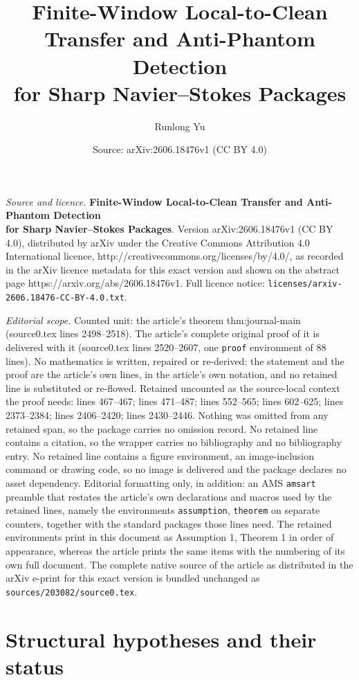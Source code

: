 \documentclass[10pt,a4paper]{amsart}
\title{\textbf{Finite-Window Local-to-Clean Transfer and Anti-Phantom Detection\\ for Sharp Navier--Stokes Packages}}
\author{Runlong Yu}
\date{Source: arXiv:2606.18476v1 (CC BY 4.0)}
\begin{document}
\maketitle

\noindent\emph{Source and licence.} \textbf{Finite-Window Local-to-Clean Transfer and Anti-Phantom Detection\\ for Sharp Navier--Stokes Packages}. Version arXiv:2606.18476v1 (CC BY 4.0), distributed by arXiv under the Creative Commons Attribution 4.0 International licence, http://creativecommons.org/licenses/by/4.0/, as recorded in the arXiv licence metadata for this exact version and shown on the abstract page https://arxiv.org/abs/2606.18476v1. Full licence notice: \texttt{licenses/arxiv-2606.18476-CC-BY-4.0.txt}.\par\smallskip

\noindent\textit{Editorial scope.} Counted unit: the article's theorem thm:journal-main (source0.tex lines 2498--2518). The article's complete original proof of it is delivered with it (source0.tex lines 2520--2607, one \texttt{proof} environment of 88 lines). No mathematics is written, repaired or re-derived: the statement and the proof are the article's own lines, in the article's own notation, and no retained line is substituted or re-flowed.  Retained uncounted as the source-local context the proof needs: lines 467--467; lines 471--487; lines 552--565; lines 602--625; lines 2373--2384; lines 2406--2420; lines 2430--2446.  Nothing was omitted from any retained span, so the package carries no omission record.  No retained line contains a citation, so the wrapper carries no bibliography and no bibliography entry.  No retained line contains a figure environment, an image-inclusion command or drawing code, so no image is delivered and the package declares no asset dependency.  Editorial formatting only, in addition: an AMS \texttt{amsart} preamble that restates the article's own declarations and macros used by the retained lines, namely the environments \texttt{assumption}, \texttt{theorem} on separate counters, together with the standard packages those lines need.  The retained environments print in this document as Assumption 1, Theorem 1 in order of appearance, whereas the article prints the same items with the numbering of its own full document.  The complete native source of the article as distributed in the arXiv e-print for this exact version is bundled unchanged as \texttt{sources/203082/source0.tex}.
\section{Structural hypotheses and their status}\label{sec:hypotheses}
\end{document}

